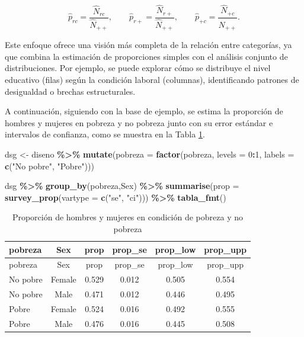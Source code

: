\documentclass[
  spanish,
  12pt,
]{book}
\newenvironment{Shaded}{\begin{snugshade}}{\end{snugshade}}
\newcommand{\AttributeTok}[1]{\textcolor[rgb]{0.13,0.29,0.53}{#1}}
\newcommand{\DecValTok}[1]{\textcolor[rgb]{0.00,0.00,0.81}{#1}}
\newcommand{\FunctionTok}[1]{\textcolor[rgb]{0.13,0.29,0.53}{\textbf{#1}}}
\newcommand{\NormalTok}[1]{#1}
\newcommand{\OtherTok}[1]{\textcolor[rgb]{0.56,0.35,0.01}{#1}}
\newcommand{\SpecialCharTok}[1]{\textcolor[rgb]{0.81,0.36,0.00}{\textbf{#1}}}
\newcommand{\StringTok}[1]{\textcolor[rgb]{0.31,0.60,0.02}{#1}}
\begin{document}
\[
\hat{p}_{rc} = \frac{\hat{N}_{rc}}{\hat{N}_{++}}, \qquad 
\hat{p}_{r+} = \frac{\hat{N}_{r+}}{\hat{N}_{++}}, \qquad 
\hat{p}_{+c} = \frac{\hat{N}_{+c}}{\hat{N}_{++}}.
\]

Este enfoque ofrece una visión más completa de la relación entre categorías, ya que combina la estimación de proporciones simples con el análisis conjunto de distribuciones. Por ejemplo, se puede explorar cómo se distribuye el nivel educativo (filas) según la condición laboral (columnas), identificando patrones de desigualdad o brechas estructurales.

A continuación, siguiendo con la base de ejemplo, se estima la proporción de hombres y mujeres en pobreza y no pobreza junto con su error estándar e intervalos de confianza, como se muestra en la Tabla \ref{tab:tab-contingencia-pobreza-sexo}.

\begin{Shaded}
\begin{Highlighting}[]
\NormalTok{dsg }\OtherTok{\textless{}{-}}\NormalTok{ diseno }\SpecialCharTok{\%\textgreater{}\%} 
       \FunctionTok{mutate}\NormalTok{(}\AttributeTok{pobreza =} \FunctionTok{factor}\NormalTok{(pobreza, }\AttributeTok{levels =} \DecValTok{0}\SpecialCharTok{:}\DecValTok{1}\NormalTok{,}
                          \AttributeTok{labels =} \FunctionTok{c}\NormalTok{(}\StringTok{"No pobre"}\NormalTok{, }\StringTok{"Pobre"}\NormalTok{))) }
\end{Highlighting}
\end{Shaded}

\begin{Shaded}
\begin{Highlighting}[]
\NormalTok{dsg }\SpecialCharTok{\%\textgreater{}\%}
  \FunctionTok{group\_by}\NormalTok{(pobreza,Sex) }\SpecialCharTok{\%\textgreater{}\%}
  \FunctionTok{summarise}\NormalTok{(}\AttributeTok{prop =} \FunctionTok{survey\_prop}\NormalTok{(}\AttributeTok{vartype =} \FunctionTok{c}\NormalTok{(}\StringTok{"se"}\NormalTok{, }\StringTok{"ci"}\NormalTok{))) }\SpecialCharTok{\%\textgreater{}\%}
  \FunctionTok{tabla\_fmt}\NormalTok{()}
\end{Highlighting}
\end{Shaded}

\begin{longtable}[]{@{}lccccc@{}}
\caption{\label{tab:tab-contingencia-pobreza-sexo}Proporción de hombres y mujeres en condición de pobreza y no pobreza}\tabularnewline
\toprule\noalign{}
pobreza & Sex & prop & prop\_se & prop\_low & prop\_upp \\
\midrule\noalign{}
\endfirsthead
\toprule\noalign{}
pobreza & Sex & prop & prop\_se & prop\_low & prop\_upp \\
\midrule\noalign{}
\endhead
\bottomrule\noalign{}
\endlastfoot
No pobre & Female & 0.529 & 0.012 & 0.505 & 0.554 \\
No pobre & Male & 0.471 & 0.012 & 0.446 & 0.495 \\
Pobre & Female & 0.524 & 0.016 & 0.492 & 0.555 \\
Pobre & Male & 0.476 & 0.016 & 0.445 & 0.508 \\
\end{longtable}
\end{document}
